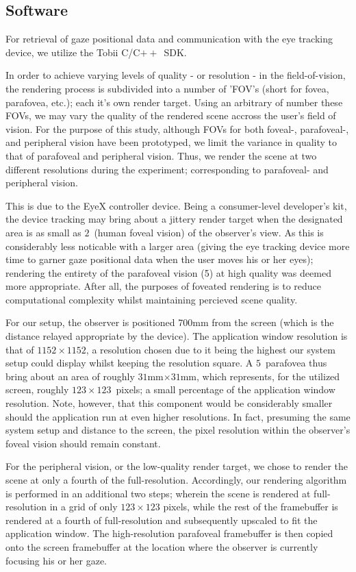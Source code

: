 \subsection{Software}
For retrieval of gaze positional data and communication with the eye tracking device, we utilize the Tobii C/C$++$~SDK.

In order to achieve varying levels of quality - or resolution - in the field-of-vision, the rendering process is subdivided into a number of 'FOV's (short for fovea, parafovea, etc.); each it's own render target.
Using an arbitrary of number these FOVs, we may vary the quality of the rendered scene accross the user's field of vision.
For the purpose of this study, although FOVs for both foveal-, parafoveal-, and peripheral vision have been prototyped, we limit the variance in quality to that of parafoveal and peripheral vision.
Thus, we render the scene at two different resolutions during the experiment; corresponding to parafoveal- and peripheral vision.

This is due to the EyeX controller device.
Being a consumer-level developer's kit, the device tracking may bring about a jittery render target when the designated area is as small as $2$\degree\ (human foveal vision) of the observer's view.
As this is considerably less noticable with a larger area (giving the eye tracking device more time to garner gaze positional data when the user moves his or her eyes); rendering the entirety of the parafoveal vision (5\degree ) at high quality was deemed more appropriate.
After all, the purposes of foveated rendering is to reduce computational complexity whilst maintaining percieved scene quality.

For our setup, the observer is positioned 700mm from the screen (which is the distance relayed appropriate by the device).
The application window resolution is that of $1152\times 1152$, a resolution chosen due to it being the highest our system setup could display whilst keeping the resolution square.
A $5$\degree\ parafovea thus bring about an area of roughly $31$mm$\times $$31$mm, which represents, for the utilized screen, roughly $123\times 123$~pixels; a small percentage of the application window resolution.
Note, however, that this component would be considerably smaller should the application run at even higher resolutions.
In fact, presuming the same system setup and distance to the screen, the pixel resolution within the observer's foveal vision should remain constant.

For the peripheral vision, or the low-quality render target, we chose to render the scene at only a fourth of the full-resolution.
Accordingly, our rendering algorithm is performed in an additional two steps; wherein the scene is rendered at full-resolution in a grid of only $123\times 123$ pixels, while the rest of the framebuffer is rendered at a fourth of full-resolution and subsequently upscaled to fit the application window.
The high-resolution parafoveal framebuffer is then copied onto the screen framebuffer at the location where the observer is currently focusing his or her gaze.

